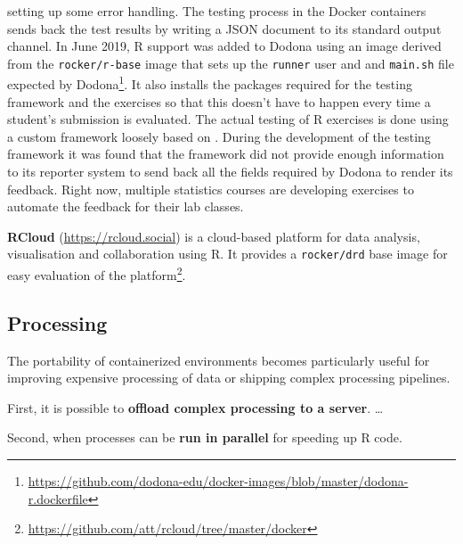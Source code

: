 setting up some error handling. The testing process in the Docker
containers sends back the test results by writing a JSON document to its
standard output channel. In June 2019, R support was added to Dodona
using an image derived from the \texttt{rocker/r-base} image that sets
up the \texttt{runner} user and and \texttt{main.sh} file expected by
Dodona\footnote{\href{https://github.com/dodona-edu/docker-images/blob/master/dodona-r.dockerfile}{https://github.com/dodona-edu/docker-images/blob/master/dodona-r.dockerfile}}.
It also installs the packages required for the testing framework and the
exercises so that this doesn't have to happen every time a student's
submission is evaluated. The actual testing of R exercises is done using
a custom framework loosely based on . During the
development of the testing framework it was found that the
 framework did not provide enough information to its
reporter system to send back all the fields required by Dodona to render
its feedback. Right now, multiple statistics courses are developing
exercises to automate the feedback for their lab classes.

\textbf{RCloud} (\url{https://rcloud.social}) is a cloud-based platform
for data analysis, visualisation and collaboration using R. It provides
a \texttt{rocker/drd} base image for easy evaluation of the
platform\footnote{\href{https://github.com/att/rcloud/tree/master/docker}{https://github.com/att/rcloud/tree/master/docker}}.

\hypertarget{processing}{%
\subsection{Processing}\label{processing}}

\label{processing}

The portability of containerized environments becomes particularly
useful for improving expensive processing of data or shipping complex
processing pipelines.

First, it is possible to \textbf{offload complex processing to a
server}. \ldots{}

Second, when processes can be \textbf{run in parallel} for speeding up R
code.

